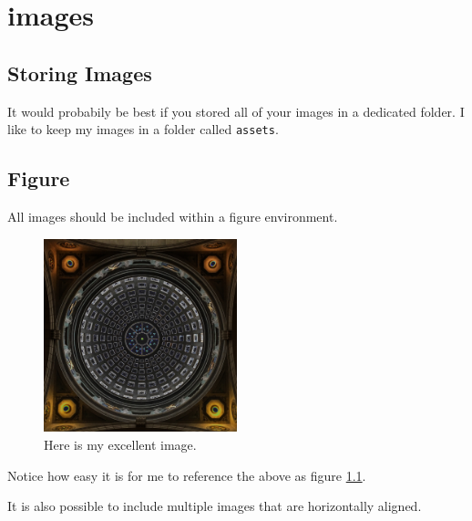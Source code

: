 \chapter{images}

\section{Storing Images}
It would probabily be best if you stored all of your images in a dedicated folder.
I like to keep my images in a folder called \verb!assets!.  


\section{Figure}

All images should be included within a figure environment.

\begin{figure}[h]
    \includegraphics[width = 0.5\textwidth]{assets/image.jpg}
    \caption{Here is my excellent image.}
    \label{fig:img001}
\end{figure}

Notice how easy it is for me to reference the above as figure \ref{fig:img001}.

It is also possible to include multiple images that are horizontally aligned.

